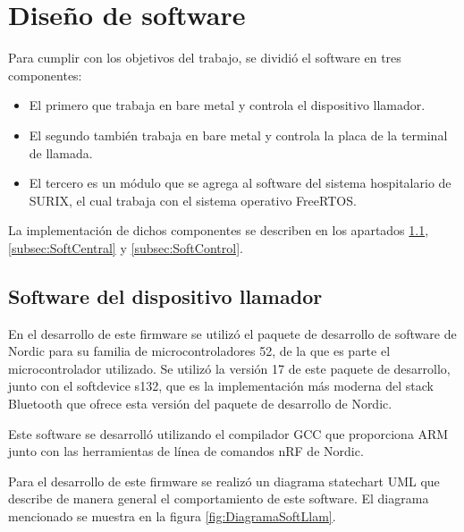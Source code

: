 
\section{Diseño de software}

Para cumplir con los objetivos del trabajo, se dividió el software en tres componentes:

\begin{itemize}

\item El primero que trabaja en bare metal y controla el dispositivo llamador.

\item El segundo también trabaja en bare metal y controla la placa de la terminal de llamada.

\item El tercero es un módulo que se agrega al software del sistema hospitalario de SURIX, el cual trabaja con el sistema operativo FreeRTOS.

\end{itemize}

La implementación de dichos componentes se describen en los apartados \ref{subsec:SoftLlam}, \ref{subsec:SoftCentral} y \ref{subsec:SoftControl}.

\subsection{Software del dispositivo llamador}
\label{subsec:SoftLlam}

En el desarrollo de este firmware se utilizó el paquete de desarrollo de software de Nordic para su familia de microcontroladores 52, de la que es parte el microcontrolador utilizado. Se utilizó la versión 17 de este paquete de desarrollo,  junto con el softdevice s132, que es la implementación más moderna del stack Bluetooth que ofrece esta versión del paquete de desarrollo de Nordic.

Este software se desarrolló utilizando el compilador GCC que proporciona ARM junto con las herramientas de línea de comandos nRF de Nordic.

Para el desarrollo de este firmware se realizó un diagrama statechart UML que describe de manera general el comportamiento de este software. El diagrama mencionado se muestra en la figura \ref{fig:DiagramaSoftLlam}.

